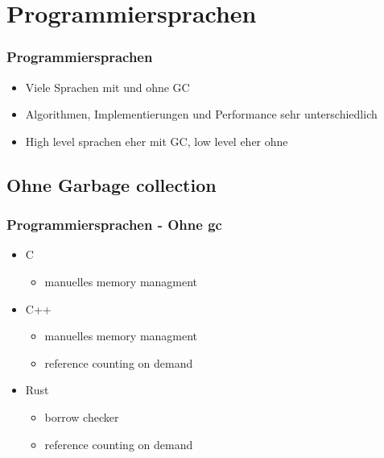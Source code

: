 \documentclass{beamer}
\begin{document}
    \section{Programmiersprachen}
        \begin{frame}
            \frametitle{Programmiersprachen}

            \begin{itemize}
                \item Viele Sprachen mit und ohne GC
                \item Algorithmen, Implementierungen und Performance sehr unterschiedlich
                \item High level sprachen eher mit GC, low level eher ohne
            \end{itemize}
        \end{frame}

        \subsection{Ohne Garbage collection}
            \begin{frame}
                \frametitle{Programmiersprachen - Ohne gc}

                \begin{itemize}
                    \item C
                    \begin{itemize}
                        \item manuelles memory managment
                    \end{itemize}
                    \item C++
                    \begin{itemize}
                        \item manuelles memory managment
                        \item reference counting on demand
                    \end{itemize}
                    \item Rust
                    \begin{itemize}
                        \item borrow checker
                        \item reference counting on demand
                    \end{itemize}
                \end{itemize}
            \end{frame}
\end{document}
